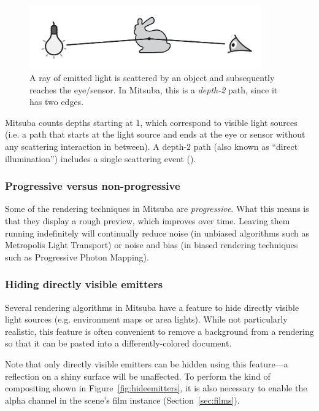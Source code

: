 \begin{figure}[h!]
\centering
\vspace{-5mm}
\includegraphics[width=10cm]{images/path_explanation.pdf}
\vspace{-5mm}
\caption{
	\label{fig:path-explanation}
	A ray of emitted light is scattered by an object and subsequently
	reaches the eye/sensor.
	In Mitsuba, this is a \emph{depth-2} path, since it has two edges.
}
\end{figure}
Mitsuba counts depths starting at $1$, which correspond to
visible light sources (i.e. a path that starts at the light
source and ends at the eye or sensor without any scattering
interaction in between).
A depth-$2$ path (also known as ``direct illumination'') includes
a single scattering event ().

\subsubsection*{Progressive versus non-progressive}
Some of the rendering techniques in Mitsuba are \emph{progressive}.
What this means is that they display a rough preview, which improves over time.
Leaving them running indefinitely will continually reduce noise (in unbiased algorithms
such as Metropolis Light Transport) or noise and bias (in biased
rendering techniques such as Progressive Photon Mapping).
\newpage
\subsubsection*{Hiding directly visible emitters}
\label{sec:hideemitters}
Several rendering algorithms in Mitsuba have a feature to hide directly
visible light sources (e.g. environment maps or area lights). While not
particularly realistic, this feature is often convenient to remove a background
from a rendering so that it can be pasted into a differently-colored document.

Note that only directly visible emitters can be hidden using this feature---a
reflection on a shiny surface will be unaffected. To perform the kind of
compositing shown in Figure~\ref{fig:hideemitters}, it is also necessary to
enable the alpha channel in the scene's film instance (Section~\ref{sec:films}).

